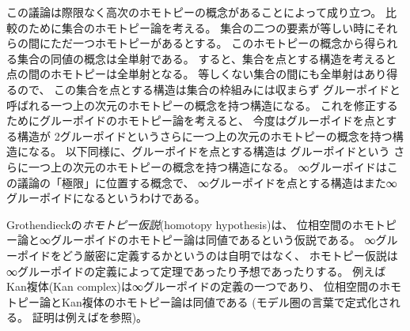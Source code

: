 \documentclass[index]{subfiles}
\begin{document}
この議論は際限なく高次のホモトピーの概念があることによって成り立つ。
比較のために集合のホモトピー論を考える。
集合の二つの要素が等しい時にそれらの間にただ一つホモトピーがあるとする。
このホモトピーの概念から得られる集合の同値の概念は全単射である。
すると、集合を点とする構造を考えると点の間のホモトピーは全単射となる。
等しくない集合の間にも全単射はあり得るので、
この集合を点とする構造は集合の枠組みには収まらず
グルーポイドと呼ばれる一つ上の次元のホモトピーの概念を持つ構造になる。
これを修正するためにグルーポイドのホモトピー論を考えると、
今度はグルーポイドを点とする構造が
2グルーポイドというさらに一つ上の次元のホモトピーの概念を持つ構造になる。
以下同様に、グルーポイドを点とする構造は
グルーポイドという
さらに一つ上の次元のホモトピーの概念を持つ構造になる。
∞グルーポイドはこの議論の「極限」に位置する概念で、
∞グルーポイドを点とする構造はまた∞グルーポイドになるというわけである。

Grothendieckの\emph{ホモトピー仮説}(homotopy hypothesis)は、
位相空間のホモトピー論と∞グルーポイドのホモトピー論は同値であるという仮説である。
∞グルーポイドをどう厳密に定義するかというのは自明ではなく、
ホモトピー仮説は∞グルーポイドの定義によって定理であったり予想であったりする。
例えばKan複体(Kan complex)は∞グルーポイドの定義の一つであり、
位相空間のホモトピー論とKan複体のホモトピー論は同値である
(モデル圏の言葉で定式化される。
証明は例えばを参照)。
\end{document}
